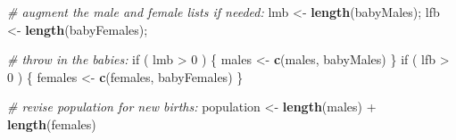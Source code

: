 \documentclass[]{book}
\makeatletter
\newenvironment{Shaded}{\begin{snugshade}}{\end{snugshade}}
\newcommand{\KeywordTok}[1]{\textcolor[rgb]{0.13,0.29,0.53}{\textbf{{#1}}}}
\newcommand{\DecValTok}[1]{\textcolor[rgb]{0.00,0.00,0.81}{{#1}}}
\newcommand{\StringTok}[1]{\textcolor[rgb]{0.31,0.60,0.02}{{#1}}}
\newcommand{\CommentTok}[1]{\textcolor[rgb]{0.56,0.35,0.01}{\textit{{#1}}}}
\newcommand{\NormalTok}[1]{{#1}}
\newenvironment{kframe}{%
\medskip{}
\setlength{\fboxsep}{.8em}
 \def\at@end@of@kframe{}%
 \ifinner\ifhmode%
  \def\at@end@of@kframe{\end{minipage}}%
  \begin{minipage}{\columnwidth}%
 \fi\fi%
 \def\FrameCommand##1{\hskip\@totalleftmargin \hskip-\fboxsep
 \colorbox{shadecolor}{##1}\hskip-\fboxsep
     \hskip-\linewidth \hskip-\@totalleftmargin \hskip\columnwidth}%
 \MakeFramed {\advance\hsize-\width
   \@totalleftmargin\z@ \linewidth\hsize
   \@setminipage}}%
 {\par\unskip\endMakeFramed%
 \at@end@of@kframe}
\renewenvironment{Shaded}{\begin{kframe}}{\end{kframe}}
\theoremstyle{definition}
\theoremstyle{definition}
\theoremstyle{remark}
\makeatother
\begin{document}
{\begin{Shaded}
\begin{Highlighting}[]
            \CommentTok{# augment the male and female lists if needed:}
            \NormalTok{lmb <-}\StringTok{ }\KeywordTok{length}\NormalTok{(babyMales); lfb <-}\StringTok{ }\KeywordTok{length}\NormalTok{(babyFemales);}
            
            \CommentTok{# throw in the babies:}
            \NormalTok{if ( lmb >}\StringTok{ }\DecValTok{0} \NormalTok{) \{}
              \NormalTok{males <-}\StringTok{ }\KeywordTok{c}\NormalTok{(males, babyMales)}
            \NormalTok{\}}
            \NormalTok{if ( lfb >}\StringTok{ }\DecValTok{0} \NormalTok{) \{}
              \NormalTok{females <-}\StringTok{ }\KeywordTok{c}\NormalTok{(females, babyFemales)}
            \NormalTok{\}}
            
            \CommentTok{# revise population for new births:}
            \NormalTok{population <-}\StringTok{ }\KeywordTok{length}\NormalTok{(males) +}\StringTok{ }\KeywordTok{length}\NormalTok{(females)}
            

\end{Highlighting}
\end{Shaded}}
\end{document}
